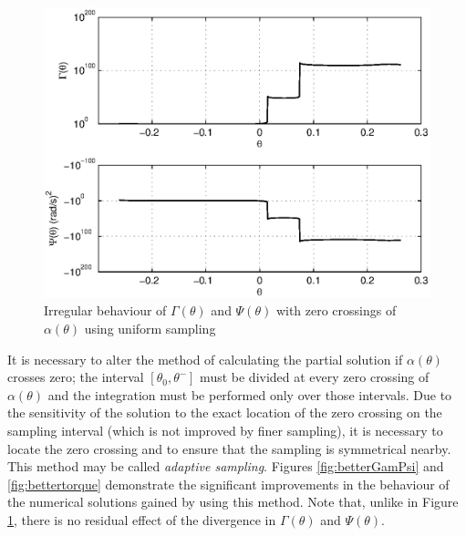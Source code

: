 \begin{figure}
	\centering
	\includegraphics[width=0.6\linewidth]{4VirtConstLib/GamPsi0Crossing.eps}
	\caption[Irregular behaviour of $\Gamma(\theta)$ and $\Psi(\theta)$ with zero crossings of $\alpha(\theta)$]{Irregular behaviour of $\Gamma(\theta)$ and $\Psi(\theta)$ with zero crossings of $\alpha(\theta)$ using uniform sampling}
	\label{fig:divergence0crossing}
\end{figure}


It is necessary to alter the method of calculating the partial solution if $\alpha(\theta)$ crosses zero; the interval $[\theta_0, \theta^-]$ must be divided at every zero crossing of $\alpha(\theta)$ and the integration must be performed only over those intervals. Due to the sensitivity of the solution to the exact location of the zero crossing on the sampling interval (which is not improved by finer sampling), it is necessary to locate the zero crossing and to ensure that the sampling is symmetrical nearby. This method may be called \textit{adaptive sampling}. Figures \ref{fig:betterGamPsi} and \ref{fig:bettertorque} demonstrate the significant improvements in the behaviour of the numerical solutions gained by using this method. Note that, unlike in Figure \ref{fig:divergence0crossing}, there is no residual effect of the divergence in $\Gamma(\theta)$ and $\Psi(\theta)$.

